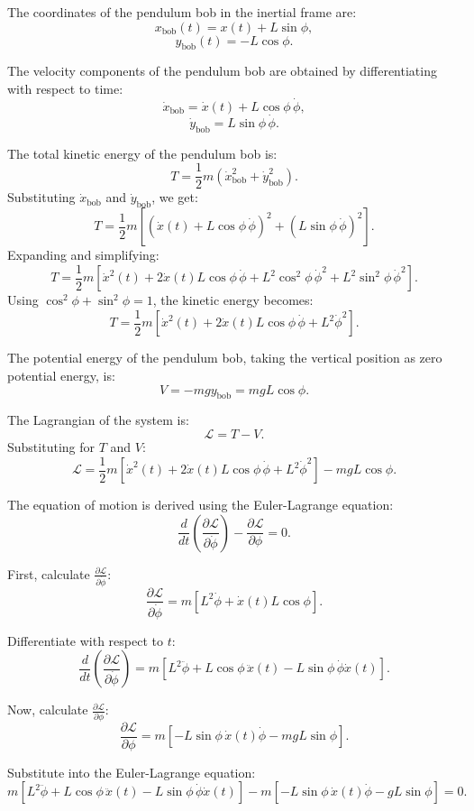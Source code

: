 The coordinates of the pendulum bob in the inertial frame are:
\[
x_\text{bob}(t) = x(t) + L\sin\phi,
\]
\[
y_\text{bob}(t) = -L\cos\phi.
\]

The velocity components of the pendulum bob are obtained by differentiating with respect to time:
\[
\dot{x}_\text{bob} = \dot{x}(t) + L\cos\phi \, \dot{\phi},
\]
\[
\dot{y}_\text{bob} = L\sin\phi \, \dot{\phi}.
\]

The total kinetic energy of the pendulum bob is:
\[
T = \frac{1}{2}m\left(\dot{x}_\text{bob}^2 + \dot{y}_\text{bob}^2\right).
\]
Substituting $\dot{x}_\text{bob}$ and $\dot{y}_\text{bob}$, we get:
\[
T = \frac{1}{2}m\left[\left(\dot{x}(t) + L\cos\phi \, \dot{\phi}\right)^2 + \left(L\sin\phi \, \dot{\phi}\right)^2\right].
\]
Expanding and simplifying:
\[
T = \frac{1}{2}m\left[\dot{x}^2(t) + 2\dot{x}(t)L\cos\phi \, \dot{\phi} + L^2\cos^2\phi \, \dot{\phi}^2 + L^2\sin^2\phi \, \dot{\phi}^2\right].
\]
Using $\cos^2\phi + \sin^2\phi = 1$, the kinetic energy becomes:
\[
T = \frac{1}{2}m\left[\dot{x}^2(t) + 2\dot{x}(t)L\cos\phi \, \dot{\phi} + L^2\dot{\phi}^2\right].
\]

The potential energy of the pendulum bob, taking the vertical position as zero potential energy, is:
\[
V = -mg y_\text{bob} = mgL\cos\phi.
\]

The Lagrangian of the system is:
\[
\mathcal{L} = T - V.
\]
Substituting for $T$ and $V$:
\[
\mathcal{L} = \frac{1}{2}m\left[\dot{x}^2(t) + 2\dot{x}(t)L\cos\phi \, \dot{\phi} + L^2\dot{\phi}^2\right] - mgL\cos\phi.
\]

The equation of motion is derived using the Euler-Lagrange equation:
\[
\frac{d}{dt}\left(\frac{\partial \mathcal{L}}{\partial \dot{\phi}}\right) - \frac{\partial \mathcal{L}}{\partial \phi} = 0.
\]

First, calculate $\frac{\partial \mathcal{L}}{\partial \dot{\phi}}$:
\[
\frac{\partial \mathcal{L}}{\partial \dot{\phi}} = m\left[L^2\dot{\phi} + \dot{x}(t)L\cos\phi\right].
\]

Differentiate with respect to $t$:
\[
\frac{d}{dt}\left(\frac{\partial \mathcal{L}}{\partial \dot{\phi}}\right) = m\left[L^2\ddot{\phi} + L\cos\phi \, \ddot{x}(t) - L\sin\phi \, \dot{\phi}\dot{x}(t)\right].
\]

Now, calculate $\frac{\partial \mathcal{L}}{\partial \phi}$:
\[
\frac{\partial \mathcal{L}}{\partial \phi} = m\left[-L\sin\phi \, \dot{x}(t)\dot{\phi} - mgL\sin\phi\right].
\]

Substitute into the Euler-Lagrange equation:
\[
m\left[L^2\ddot{\phi} + L\cos\phi \, \ddot{x}(t) - L\sin\phi \, \dot{\phi}\dot{x}(t)\right] - m\left[-L\sin\phi \, \dot{x}(t)\dot{\phi} - gL\sin\phi\right] = 0.
\]

